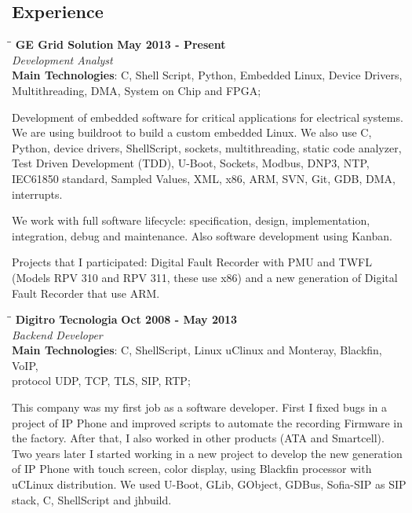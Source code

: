 \documentclass[margin]{res}
\begin{document}
\begin{resume}
\section{Experience}
\vspace{-0.1in}
    \begin{tabbing}
    \hspace{2.3in}\= \hspace{1.7in}\= \kill %
    \textbf{GE Grid Solution}    \>\>\textbf{May 2013 - Present}\\
    \textit{Development Analyst}\\
    \textbf{Main Technologies}: C, Shell Script, Python, Embedded Linux, Device Drivers,\\
                                Multithreading, DMA, System on Chip and FPGA;
    \end{tabbing}\vspace{-20pt}      %
    \vspace{2mm}
Development of embedded software for critical applications for electrical systems. We are using buildroot to build a custom embedded Linux. We also use C, Python, device drivers, ShellScript, sockets, multithreading, static code analyzer, Test Driven Development (TDD), U-Boot, Sockets, Modbus, DNP3, NTP, IEC61850 standard, Sampled Values, XML, x86, ARM, SVN, Git, GDB, DMA, interrupts.

We work with full software lifecycle: specification, design, implementation, integration, debug and maintenance. Also software development using Kanban.

Projects that I participated: Digital Fault Recorder with PMU and TWFL (Models RPV 310 and RPV 311, these use x86) and a new generation of Digital Fault Recorder that use ARM.

\vspace{-0.1in}
    \begin{tabbing}
    \hspace{2.3in}\= \hspace{1.7in}\= \kill
    \textbf{Digitro Tecnologia}    \>\>\textbf{Oct 2008 - May 2013}\\
    \textit{Backend Developer}\\
    \textbf{Main Technologies}: C, ShellScript, Linux uClinux and Monteray, Blackfin, VoIP,\\ protocol UDP, TCP, TLS, SIP, RTP;
    \end{tabbing}\vspace{-20pt}
    \vspace{2mm}
This company was my first job as a software developer. First I fixed bugs in a project of IP Phone and improved scripts to automate the recording Firmware in the factory. After that, I also worked in other products (ATA and Smartcell). Two years later I started working in a new project to develop the new generation of IP Phone with touch screen, color display, using Blackfin processor with uCLinux distribution. We used U-Boot, GLib, GObject, GDBus, Sofia-SIP as SIP stack, C, ShellScript and jhbuild.


\end{resume}
\end{document}
